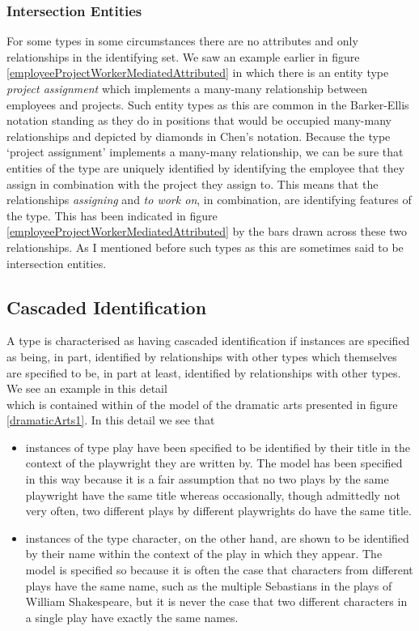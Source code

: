 \subsubsection{Intersection Entities}
\mynote {}
For some types in some circumstances there are no attributes and only relationships in the identifying set. 
We saw an example earlier
in figure \ref{employeeProjectWorkerMediatedAttributed} in  which there is an entity type
\textit{project assignment} which implements a many-many relationship between employees and projects. 
Such entity types as this are common in the Barker-Ellis notation 
standing as they do in positions that would be occupied many-many relationships
 and depicted by  diamonds in Chen's notation. 
 Because the type `project assignment' implements a many-many relationship, we can be sure that entities of the type  are uniquely identified by 
 identifying the employee that they assign in combination with the project they assign to. This means that the relationships \textit{assigning} and \textit{to work on}, in combination, are identifying features of the type. This has been indicated in 
figure  \ref{employeeProjectWorkerMediatedAttributed} by the bars drawn across these two relationships. As I mentioned before such types as this are sometimes said to be intersection entities.


\subsection{Cascaded Identification}
\label{Cascaded Identification}
\mynote
A type is characterised as having cascaded identification if instances are specified as being, in part, identified by relationships with other types which themselves are specified to be, in part at least, identified by relationships with other types.
\mynote
We see an example in this detail
\begin{equation*}

\end{equation*}
which is contained within of the model of the dramatic arts presented in figure \ref{dramaticArts1}. 
In this detail we see that
\begin{itemize}
\item
instances of  type play have been specified to be identified by their title 
in the context of the playwright  they are written by.
The model has been specified in this way 
because it is a fair assumption that no two plays by the same playwright have the same title
whereas occasionally, though admittedly not very often, 
two different plays by different playwrights do have the same title.  
\item instances of the type character, on the other hand,  are shown to be identified by their name within the context of the play in which they appear. 
The model is specified so because it is often the case that characters from different plays have the same name, such as the multiple Sebastians in the plays of William Shakespeare, but it is never the case that two different characters in a single play have exactly the same names.
\end{itemize}

